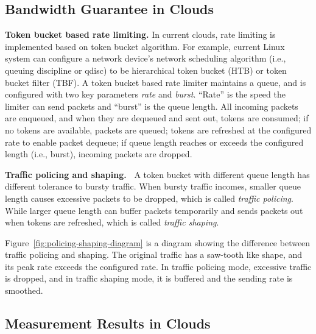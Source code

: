 \subsection{Bandwidth Guarantee in Clouds}
\label{ssec:bandwidth-guarantee-in-clouds} 

\textbf{Token bucket based rate limiting.}
In current clouds, rate limiting is implemented based on token bucket algorithm. For example, current Linux system can configure a network device's  network scheduling algorithm (i.e., queuing discipline or qdisc) to be hierarchical token bucket (HTB) or token bucket filter (TBF). 
A token bucket based rate limiter maintains a queue, and is configured with two key parameters \textemdash\xspace \textit{rate} and \textit{burst}. ``Rate'' is the speed the limiter can send packets and ``burst'' is the queue length. All incoming packets are enqueued, and when they are dequeued and sent out, tokens are consumed; if no tokens are available, packets are queued; tokens are refreshed at the configured rate to enable packet dequeue; if queue length reaches or exceeds the configured length (i.e., burst), incoming packets are dropped.

\textbf{Traffic policing and shaping.~\cite{limitingandshaping}}
A token bucket with different queue length has different tolerance to bursty traffic. When bursty traffic incomes, smaller queue length causes excessive packets to be dropped, which is called \textit{traffic policing}. While larger queue length can buffer packets temporarily and sends packets out when tokens are refreshed, which is called \textit{traffic shaping}. 


Figure~\ref{fig:policing-shaping-diagram} is a diagram showing the difference between traffic policing and shaping. The original traffic has a saw-tooth like shape, and its peak rate exceeds the configured rate. In traffic policing mode, excessive traffic is dropped, and in traffic shaping mode, it is buffered and the sending rate is smoothed.

\subsection{Measurement Results in Clouds}
\label{ssec:measurement-results} 



%
%




\fi
